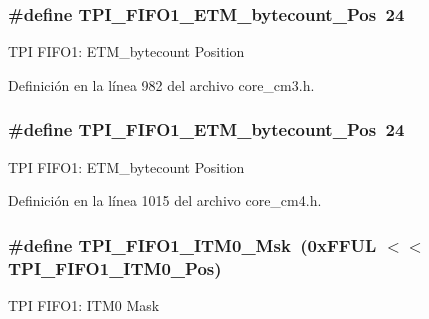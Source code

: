 \subsubsection[{\texorpdfstring{T\+P\+I\+\_\+\+F\+I\+F\+O1\+\_\+\+E\+T\+M\+\_\+bytecount\+\_\+\+Pos}{TPI_FIFO1_ETM_bytecount_Pos}}]{\setlength{\rightskip}{0pt plus 5cm}\#define T\+P\+I\+\_\+\+F\+I\+F\+O1\+\_\+\+E\+T\+M\+\_\+bytecount\+\_\+\+Pos~24}\hypertarget{group___c_m_s_i_s___t_p_i_gaab31238152b5691af633a7475eaf1f06}{}\label{group___c_m_s_i_s___t_p_i_gaab31238152b5691af633a7475eaf1f06}
T\+PI F\+I\+F\+O1\+: E\+T\+M\+\_\+bytecount Position 

Definición en la línea 982 del archivo core\+\_\+cm3.\+h.

\subsubsection[{\texorpdfstring{T\+P\+I\+\_\+\+F\+I\+F\+O1\+\_\+\+E\+T\+M\+\_\+bytecount\+\_\+\+Pos}{TPI_FIFO1_ETM_bytecount_Pos}}]{\setlength{\rightskip}{0pt plus 5cm}\#define T\+P\+I\+\_\+\+F\+I\+F\+O1\+\_\+\+E\+T\+M\+\_\+bytecount\+\_\+\+Pos~24}\hypertarget{group___c_m_s_i_s___t_p_i_gaab31238152b5691af633a7475eaf1f06}{}\label{group___c_m_s_i_s___t_p_i_gaab31238152b5691af633a7475eaf1f06}
T\+PI F\+I\+F\+O1\+: E\+T\+M\+\_\+bytecount Position 

Definición en la línea 1015 del archivo core\+\_\+cm4.\+h.

\subsubsection[{\texorpdfstring{T\+P\+I\+\_\+\+F\+I\+F\+O1\+\_\+\+I\+T\+M0\+\_\+\+Msk}{TPI_FIFO1_ITM0_Msk}}]{\setlength{\rightskip}{0pt plus 5cm}\#define T\+P\+I\+\_\+\+F\+I\+F\+O1\+\_\+\+I\+T\+M0\+\_\+\+Msk~(0x\+F\+F\+U\+L $<$$<$ T\+P\+I\+\_\+\+F\+I\+F\+O1\+\_\+\+I\+T\+M0\+\_\+\+Pos)}\hypertarget{group___c_m_s_i_s___t_p_i_ga8ae09f544fc1a428797e2a150f14a4c9}{}\label{group___c_m_s_i_s___t_p_i_ga8ae09f544fc1a428797e2a150f14a4c9}
T\+PI F\+I\+F\+O1\+: I\+T\+M0 Mask 


